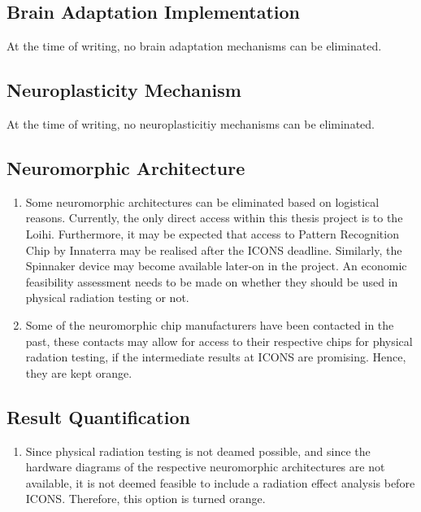 \subsection{Brain Adaptation Implementation}\label{subsec:baseline_brain_adaptation_implementation}
At the time of writing, no brain adaptation mechanisms can be eliminated.

\subsection{Neuroplasticity Mechanism}\label{subsec:baseline_neuroplasticity_mechanism}
At the time of writing, no neuroplasticitiy mechanisms can be eliminated.

\subsection{Neuromorphic Architecture}\label{subsec:baseline_neuromorphic_architecture}
\begin{enumerate}
    \item Some neuromorphic architectures can be eliminated based on logistical reasons. Currently, the only direct access within this thesis project is to the Loihi. Furthermore, it may be expected that access to Pattern Recognition Chip by Innaterra may be realised after the ICONS deadline. Similarly, the Spinnaker device may become available later-on in the project. An economic feasibility assessment needs to be made on whether they should be used in physical radiation testing or not.
    \item Some of the neuromorphic chip manufacturers have been contacted in the past, these contacts may allow for access to their respective chips for physical radation testing, if the intermediate results at ICONS are promising. Hence, they are kept orange.
\end{enumerate}

\subsection{Result Quantification}\label{subsec:baseline_result_quantification}
\begin{enumerate}
    \item Since physical radiation testing is not deamed possible, and since the hardware diagrams of the respective neuromorphic architectures are not available, it is not deemed feasible to include a radiation effect analysis before ICONS. Therefore, this option is turned orange.
\end{enumerate}


